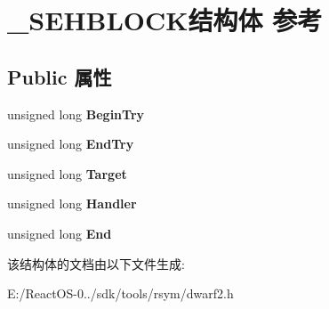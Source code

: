 \hypertarget{struct___s_e_h_b_l_o_c_k}{}\section{\+\_\+\+S\+E\+H\+B\+L\+O\+C\+K结构体 参考}
\label{struct___s_e_h_b_l_o_c_k}
\subsection*{Public 属性}
\begin{DoxyCompactItemize}
\item 
\mbox{\label{struct___s_e_h_b_l_o_c_k_a8deaf503ed25f014f0f92752c8fbb94a}} 
unsigned long {\bfseries Begin\+Try}
\item 
\mbox{\label{struct___s_e_h_b_l_o_c_k_afc26b6ebdfe16c744f3c5928c3021f37}} 
unsigned long {\bfseries End\+Try}
\item 
\mbox{\label{struct___s_e_h_b_l_o_c_k_a6cc07fbc3ad656ca7ffe93cf956b91c3}} 
unsigned long {\bfseries Target}
\item 
\mbox{\label{struct___s_e_h_b_l_o_c_k_aa64bda23a84508346c5dbf61fcc70568}} 
unsigned long {\bfseries Handler}
\item 
\mbox{\label{struct___s_e_h_b_l_o_c_k_a1824461870c6d9838f0577c49dd2f2f5}} 
unsigned long {\bfseries End}
\end{DoxyCompactItemize}


该结构体的文档由以下文件生成\+:\begin{DoxyCompactItemize}
\item 
E\+:/\+React\+O\+S-\/0../sdk/tools/rsym/dwarf2.\+h\end{DoxyCompactItemize}
